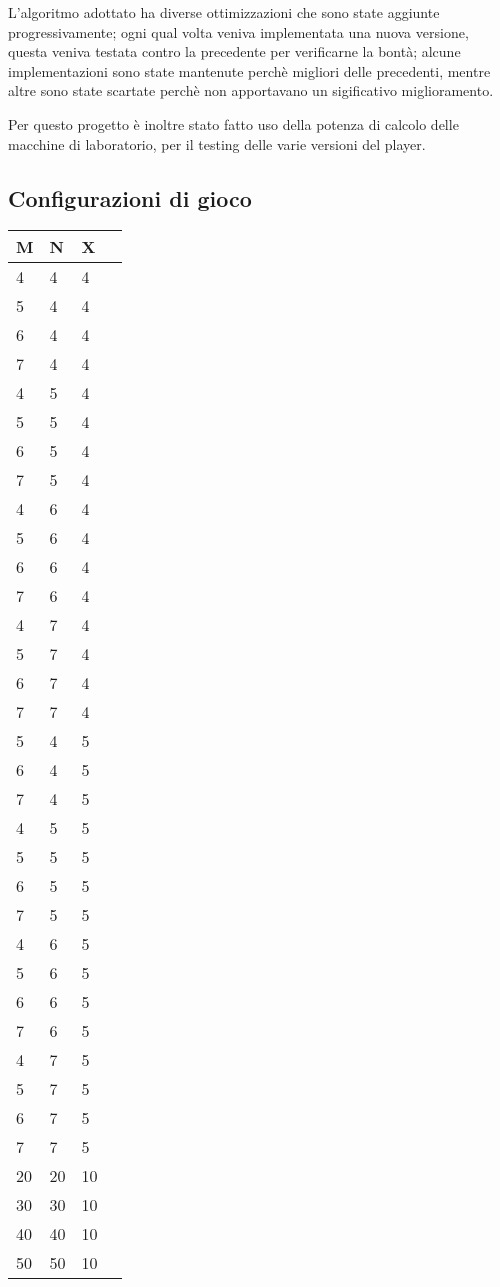 \documentclass{article}
\begin{document}
L'algoritmo adottato ha diverse ottimizzazioni che sono state aggiunte progressivamente; ogni
qual volta veniva implementata una nuova versione, questa veniva testata contro la precedente
per verificarne la bontà; alcune implementazioni sono state mantenute
perchè migliori delle precedenti, mentre altre sono state scartate perchè non apportavano
un sigificativo miglioramento.

Per questo progetto è inoltre stato fatto uso della potenza di calcolo delle macchine di
laboratorio, per il testing delle varie versioni del player.
\pagebreak

\subsection{Configurazioni di gioco}
\vspace{20pt}
{
    \centering
    \begin{tabular}{| l | l | l | l |}
    \hline
    M & N & X \\ 
    \hline
    4 & 4 & 4 \\ 
    5 & 4 & 4 \\ 
    6 & 4 & 4 \\ 
    7 & 4 & 4 \\ 
    4 & 5 & 4 \\ 
    5 & 5 & 4 \\ 
    6 & 5 & 4 \\ 
    7 & 5 & 4 \\ 
    4 & 6 & 4 \\ 
    5 & 6 & 4 \\ 
    6 & 6 & 4 \\ 
    7 & 6 & 4 \\ 
    4 & 7 & 4 \\ 
    5 & 7 & 4 \\ 
    6 & 7 & 4 \\ 
    7 & 7 & 4 \\ 
    5 & 4 & 5 \\ 
    6 & 4 & 5 \\ 
    7 & 4 & 5 \\ 
    4 & 5 & 5 \\ 
    5 & 5 & 5 \\ 
    6 & 5 & 5 \\ 
    7 & 5 & 5 \\ 
    4 & 6 & 5 \\ 
    5 & 6 & 5 \\ 
    6 & 6 & 5 \\ 
    7 & 6 & 5 \\ 
    4 & 7 & 5 \\ 
    5 & 7 & 5 \\ 
    6 & 7 & 5 \\ 
    7 & 7 & 5 \\ 
    20 & 20 & 10 \\
    30 & 30 & 10 \\
    40 & 40 & 10 \\
    50 & 50 & 10 \\
    \hline
\end{tabular}\par
}
\pagebreak
\end{document}
